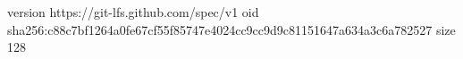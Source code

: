 version https://git-lfs.github.com/spec/v1
oid sha256:c88c7bf1264a0fe67cf55f85747e4024cc9cc9d9c81151647a634a3c6a782527
size 128
